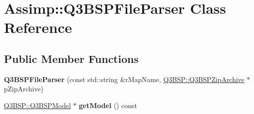 \hypertarget{class_assimp_1_1_q3_b_s_p_file_parser}{\section{Assimp\+:\+:Q3\+B\+S\+P\+File\+Parser Class Reference}
\label{class_assimp_1_1_q3_b_s_p_file_parser}
}
\subsection*{Public Member Functions}
\begin{DoxyCompactItemize}
\item 
\hypertarget{class_assimp_1_1_q3_b_s_p_file_parser_aa7bbdf215bafaf067ec7474047e91835}{{\bfseries Q3\+B\+S\+P\+File\+Parser} (const std\+::string \&r\+Map\+Name, \hyperlink{class_assimp_1_1_q3_b_s_p_1_1_q3_b_s_p_zip_archive}{Q3\+B\+S\+P\+::\+Q3\+B\+S\+P\+Zip\+Archive} $\ast$p\+Zip\+Archive)}\label{class_assimp_1_1_q3_b_s_p_file_parser_aa7bbdf215bafaf067ec7474047e91835}

\item 
\hypertarget{class_assimp_1_1_q3_b_s_p_file_parser_a969523a0c3135d538fbc37216a84644e}{\hyperlink{struct_assimp_1_1_q3_b_s_p_1_1_q3_b_s_p_model}{Q3\+B\+S\+P\+::\+Q3\+B\+S\+P\+Model} $\ast$ {\bfseries get\+Model} () const }\label{class_assimp_1_1_q3_b_s_p_file_parser_a969523a0c3135d538fbc37216a84644e}

\end{DoxyCompactItemize}
